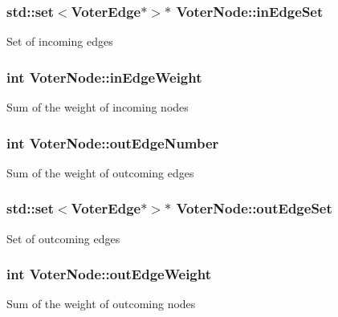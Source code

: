 \subsubsection[{in\+Edge\+Set}]{\setlength{\rightskip}{0pt plus 5cm}std\+::set$<${\bf Voter\+Edge}$\ast$$>$$\ast$ Voter\+Node\+::in\+Edge\+Set}\label{class_voter_node_a753832f3c6b57995fce832169250a520}
Set of incoming edges \hypertarget{class_voter_node_a630068d0551e05d9a7bf3eff1f3b1202}{}
\subsubsection[{in\+Edge\+Weight}]{\setlength{\rightskip}{0pt plus 5cm}int Voter\+Node\+::in\+Edge\+Weight}\label{class_voter_node_a630068d0551e05d9a7bf3eff1f3b1202}
Sum of the weight of incoming nodes \hypertarget{class_voter_node_ad02a5823353dd4f1e0a1b9965553a1ef}{}
\subsubsection[{out\+Edge\+Number}]{\setlength{\rightskip}{0pt plus 5cm}int Voter\+Node\+::out\+Edge\+Number}\label{class_voter_node_ad02a5823353dd4f1e0a1b9965553a1ef}
Sum of the weight of outcoming edges \hypertarget{class_voter_node_abbeb36b008f12217d080f9eb287ae9de}{}
\subsubsection[{out\+Edge\+Set}]{\setlength{\rightskip}{0pt plus 5cm}std\+::set$<${\bf Voter\+Edge}$\ast$$>$$\ast$ Voter\+Node\+::out\+Edge\+Set}\label{class_voter_node_abbeb36b008f12217d080f9eb287ae9de}
Set of outcoming edges \hypertarget{class_voter_node_ae092216c9048f14155b2e580236ab6a9}{}
\subsubsection[{out\+Edge\+Weight}]{\setlength{\rightskip}{0pt plus 5cm}int Voter\+Node\+::out\+Edge\+Weight}\label{class_voter_node_ae092216c9048f14155b2e580236ab6a9}
Sum of the weight of outcoming nodes \hypertarget{class_voter_node_a06aa43e2603a2c8ee7540c754ef1fce2}{}
